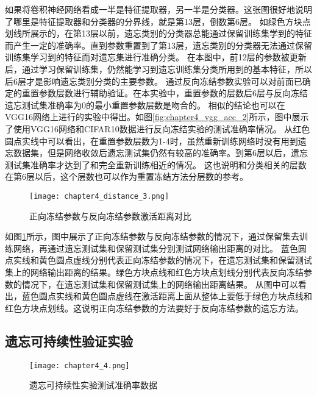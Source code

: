 如果将卷积神经网络看成一半是特征提取器，另一半是分类器。这张图很好地说明了哪里是特征提取器和分类器的分界线，就是第13层，倒数第6层。
如绿色方块点划线所展示的，在第13层以前，遗忘类别的分类器总能通过保留训练集学到的特征而产生一定的准确率。直到参数重置到了第13层，遗忘类别的分类器无法通过保留训练集学习到的特征而对遗忘集进行准确分类。
在本图中，前12层的参数被更新后，通过学习保留训练集，仍然能学习到遗忘训练集分类所用到的基本特征，所以后6层才是影响遗忘类别分类的主要参数。
通过反向冻结参数实验可以对前面已确定的重置参数层数进行辅助验证。在本实验中，重置参数的层数后6层与反向冻结遗忘测试集准确率为0的最小重置参数层数是吻合的。
相似的结论也可以在VGG16网络上进行的实验中得出。如图\ref{fig:chapter4_vgg_acc_2}所示，图中展示了使用VGG16网络和CIFAR10数据进行反向冻结实验的测试准确率情况。
从红色圆点实线中可以看出，在重置参数层数为1-4时，虽然重新训练网络时没有用到遗忘数据集，但是网络收敛后遗忘测试集仍然有较高的准确率。到第6层以后，遗忘测试集准确率才达到了和完全重新训练相近的情况。
这也说明和分类相关的层数在第6层以后，这个层数也可以作为重置冻结方法分层数的参考。

\begin{figure}
    \centering
    \texttt{[image: chapter4\_distance\_3.png]}
    \caption{正向冻结参数与反向冻结参数激活距离对比}
    \label{fig:chapter4_distance_3}
\end{figure}

如图\ref{fig:chapter4_distance_3}所示，图中展示了正向冻结参数与反向冻结参数的情况下，通过保留集去训练网络，再通过遗忘测试集和保留测试集分别测试网络输出距离的对比。
蓝色圆点实线和黄色圆点虚线分别代表正向冻结参数的情况下，在遗忘测试集和保留测试集上的网络输出距离的结果。绿色方块点线和红色方块点划线分别代表反向冻结参数的情况下，在遗忘测试集和保留测试集上的网络输出距离结果。
从图中可以看出，蓝色圆点实线和黄色圆点虚线在激活距离上面从整体上要低于绿色方块点线和红色方块点划线。这说明正向冻结参数的方法要好于反向冻结参数的遗忘方法。

\subsection{遗忘可持续性验证实验}
\begin{figure}
    \centering
    \texttt{[image: chapter4\_4.png]}
    \caption{遗忘可持续性实验测试准确率数据}
    \label{fig:chapter4_4}
\end{figure}

